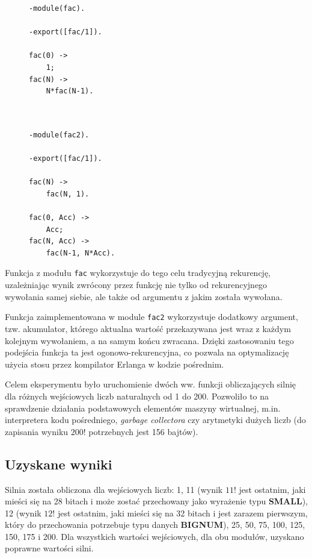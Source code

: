 \begin{figure}
\begin{multicols}{2}
\begin{lstlisting}[style=erlang, caption=Kod modułu \texttt{fac.erl}, label=lis:fac_facERL]
-module(fac).

-export([fac/1]).

fac(0) ->
    1;
fac(N) ->
    N*fac(N-1).



\end{lstlisting}

\columnbreak

\begin{lstlisting}[style=erlang, caption=Kod modułu \texttt{fac2.erl}, label=lis:fac_fac2ERL]
-module(fac2).

-export([fac/1]).

fac(N) ->
    fac(N, 1).

fac(0, Acc) ->
    Acc;
fac(N, Acc) ->
    fac(N-1, N*Acc).
\end{lstlisting}
\end{multicols}
\end{figure}

Funkcja z modułu \texttt{fac} wykorzystuje do tego celu tradycyjną rekurencję, uzależniając wynik zwrócony przez funkcję nie tylko od rekurencyjnego wywołania samej siebie, ale także od argumentu z jakim została wywołana. 

Funkcja zaimplementowana w module \texttt{fac2} wykorzystuje dodatkowy argument, tzw. akumulator, którego aktualna wartość przekazywana jest wraz z każdym kolejnym wywołaniem, a na samym końcu zwracana.
Dzięki zastosowaniu tego podejścia funkcja ta jest ogonowo-rekurencyjna, co pozwala na optymalizację użycia stosu przez kompilator Erlanga w kodzie pośrednim.

Celem eksperymentu było uruchomienie dwóch ww. funkcji obliczających silnię dla różnych wejściowych liczb naturalnych od 1 do 200. Pozwoliło to na sprawdzenie działania podstawowych elementów maszyny wirtualnej, m.in. interpretera kodu pośredniego, \emph{garbage collectora} czy arytmetyki dużych liczb (do zapisania wyniku $200!$ potrzebnych jest 156 bajtów).


\subsection{Uzyskane wyniki}

Silnia została obliczona dla wejściowych liczb: 1, 11 (wynik $11!$ jest ostatnim, jaki mieści się na 28 bitach i może zostać przechowany jako wyrażenie typu \textbf{SMALL}), 12 (wynik $12!$ jest ostatnim, jaki mieści się na 32 bitach i jest zarazem pierwszym, który do przechowania potrzebuje typu danych \textbf{BIGNUM}), 25, 50, 75, 100, 125, 150, 175 i 200. Dla wszystkich wartości wejściowych, dla obu modułów, uzyskano poprawne wartości silni.

